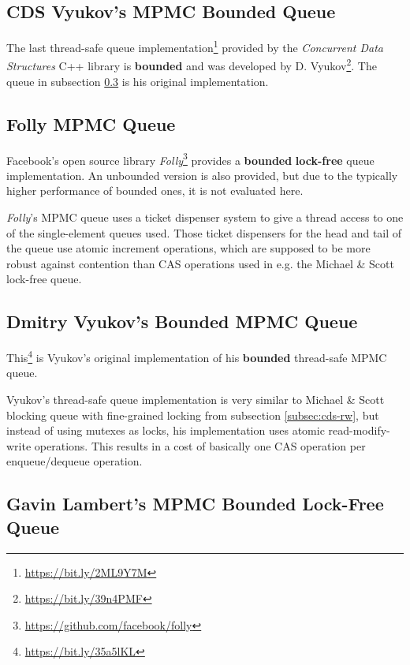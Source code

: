 \subsection[CDS VyukovMPMCCycleQueue]{CDS Vyukov's MPMC Bounded Queue} \label{subsec:cds-vyukovmpmccycle}

	The last thread-safe queue implementation\footnote{\url{https://bit.ly/2ML9Y7M}} provided by the \textit{Concurrent Data Structures} C++ library is \textbf{bounded} and was developed by D. Vyukov\footnote{\url{https://bit.ly/39n4PMF}}. The queue in subsection \ref{subsec:vyukov} is his original implementation.

\subsection[Folly MPMC Queue]{Folly MPMC Queue} \label{subsec:folly-mpmc}

	Facebook's open source library \textit{Folly}\footnote{\url{https://github.com/facebook/folly}} provides a \textbf{bounded} \textbf{lock-free} queue implementation. An unbounded version is also provided, but due to the typically higher performance of bounded ones, it is not evaluated here.
	
	\textit{Folly}'s MPMC queue uses a ticket dispenser system to give a thread access to one of the single-element queues used. Those ticket dispensers for the head and tail of the queue use atomic increment operations, which are supposed to be more robust against contention than CAS operations used in e.g. the Michael \& Scott lock-free queue.

\subsection[Dmitry Vyukov's MPMC Queue]{Dmitry Vyukov's Bounded MPMC Queue} \label{subsec:vyukov}

	This\footnote{\url{https://bit.ly/35a5lKL}} is Vyukov's original implementation of his \textbf{bounded} thread-safe MPMC queue.

	Vyukov's thread-safe queue implementation is very similar to Michael \& Scott blocking queue with fine-grained locking from subsection \ref{subsec:cds-rw}, but instead of using mutexes as locks, his implementation uses atomic read-modify-write operations. This results in a cost of basically one CAS operation per enqueue/dequeue operation.

\subsection[Gavin Lambert's MPMC Queue]{Gavin Lambert's MPMC Bounded Lock-Free Queue} \label{subsec:lampert}

